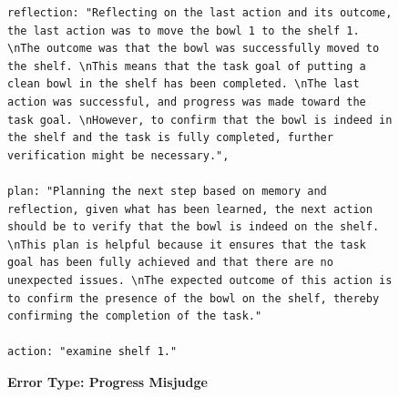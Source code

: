 \documentclass[../../main.tex]{subfiles}
\begin{document}
\begin{figure}[htbp]
\begin{tcolorbox}[
    title=\textbf{Error Type - Progress Misjudge},
    colback=orange!1!white,
    colframe=orange!50!black,
    fonttitle=\bfseries,
    enhanced jigsaw,
    breakable
]
\begin{Verbatim}[breaklines=true, breakanywhere=true]
reflection: "Reflecting on the last action and its outcome, the last action was to move the bowl 1 to the shelf 1. \nThe outcome was that the bowl was successfully moved to the shelf. \nThis means that the task goal of putting a clean bowl in the shelf has been completed. \nThe last action was successful, and progress was made toward the task goal. \nHowever, to confirm that the bowl is indeed in the shelf and the task is fully completed, further verification might be necessary.",
      
plan: "Planning the next step based on memory and reflection, given what has been learned, the next action should be to verify that the bowl is indeed on the shelf. \nThis plan is helpful because it ensures that the task goal has been fully achieved and that there are no unexpected issues. \nThe expected outcome of this action is to confirm the presence of the bowl on the shelf, thereby confirming the completion of the task."

action: "examine shelf 1."
\end{Verbatim}


\end{tcolorbox}
\vspace{-1em}
\caption{\textbf{Error Type: Progress Misjudge}}
\label{fig:error_progress_misjudge}
\end{figure}
\end{document}

